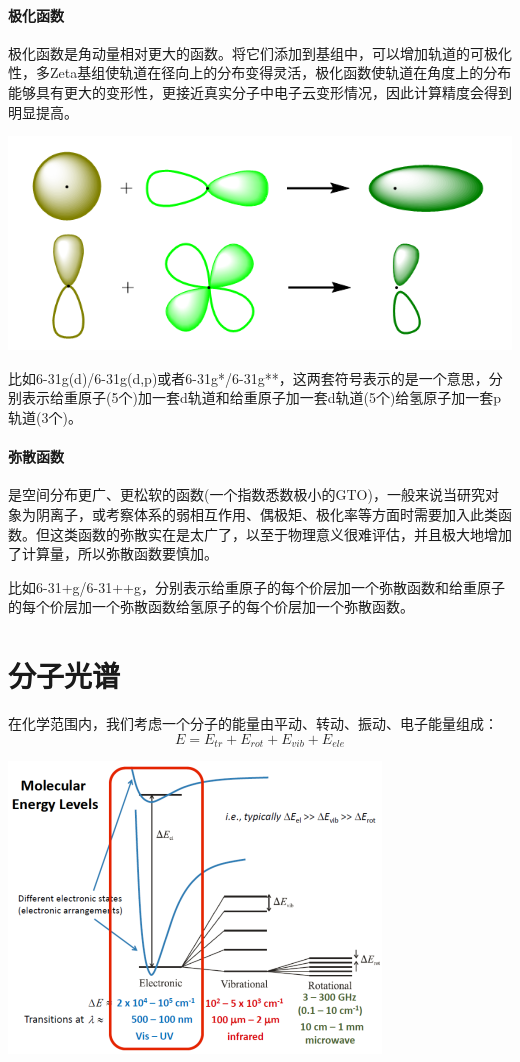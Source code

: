 \paragraph*{极化函数}
极化函数是角动量相对更大的函数。将它们添加到基组中，可以增加轨道的可极化性，多Zeta基组使轨道在径向上的分布变得灵活，极化函数使轨道在角度上的分布能够具有更大的变形性，更接近真实分子中电子云变形情况，因此计算精度会得到明显提高。
\begin{center}
    \includegraphics[scale=0.4]{fig/lzhx/polarization.png}
\end{center}
比如6-31g(d)/6-31g(d,p)或者6-31g*/6-31g**，这两套符号表示的是一个意思，分别表示给重原子(5个)加一套d轨道和给重原子加一套d轨道(5个)给氢原子加一套p轨道(3个)。
\paragraph*{弥散函数}
是空间分布更广、更松软的函数(一个指数悉数极小的GTO)，一般来说当研究对象为阴离子，或考察体系的弱相互作用、偶极矩、极化率等方面时需要加入此类函数。但这类函数的弥散实在是太广了，以至于物理意义很难评估，并且极大地增加了计算量，所以弥散函数要慎加。

比如6-31+g/6-31++g，分别表示给重原子的每个价层加一个弥散函数和给重原子的每个价层加一个弥散函数给氢原子的每个价层加一个弥散函数。



\section{分子光谱}
在化学范围内，我们考虑一个分子的能量由平动、转动、振动、电子能量组成：
\[E=E_{tr}+E_{rot}+E_{vib}+E_{ele}\]
\begin{center}
    \includegraphics{fig/lzhx/微信图片_20211102175446.png}
\end{center}

